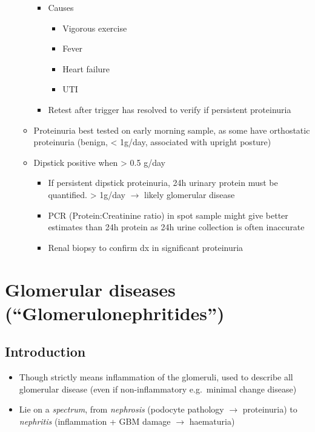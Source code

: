 \documentclass[
  12pt,
]{memoir}
\providecommand{\tightlist}{%
  \setlength{\itemsep}{0pt}\setlength{\parskip}{0pt}}
\begin{document}
\begin{itemize}
\begin{itemize}
    \begin{itemize}
    \tightlist
    \item
      Causes

      \begin{itemize}
      \tightlist
      \item
        Vigorous exercise
      \item
        Fever
      \item
        Heart failure
      \item
        UTI
      \end{itemize}
    \item
      Retest after trigger has resolved to verify if persistent
      proteinuria
    \end{itemize}
  \item
    Proteinuria best tested on early morning sample, as some have
    orthostatic proteinuria (benign, \textless{} 1g/day, associated with
    upright posture)
  \item
    Dipstick positive when \textgreater{} 0.5 g/day

    \begin{itemize}
    \tightlist
    \item
      If persistent dipstick proteinuria, 24h urinary protein must be
      quantified. \textgreater{} 1g/day \(\rightarrow\) likely
      glomerular disease
    \item
      PCR (Protein:Creatinine ratio) in spot sample might give better
      estimates than 24h protein as 24h urine collection is often
      inaccurate
    \item
      Renal biopsy to confirm dx in significant proteinuria
    \end{itemize}
  \end{itemize}
\end{itemize}

\hypertarget{glomerular-diseases-glomerulonephritides}{%
\section{Glomerular diseases
(``Glomerulonephritides'')}\label{glomerular-diseases-glomerulonephritides}}

\hypertarget{introduction}{%
\subsection{Introduction}\label{introduction}}

\begin{itemize}
\tightlist
\item
  Though strictly means inflammation of the glomeruli, used to describe
  all glomerular disease (even if non-inflammatory e.g.~minimal change
  disease)
\item
  Lie on a \emph{spectrum}, from \emph{nephrosis} (podocyte pathology
  \(\rightarrow\) proteinuria) to \emph{nephritis} (inflammation + GBM
  damage \(\rightarrow\) haematuria)
\end{itemize}
\end{document}

